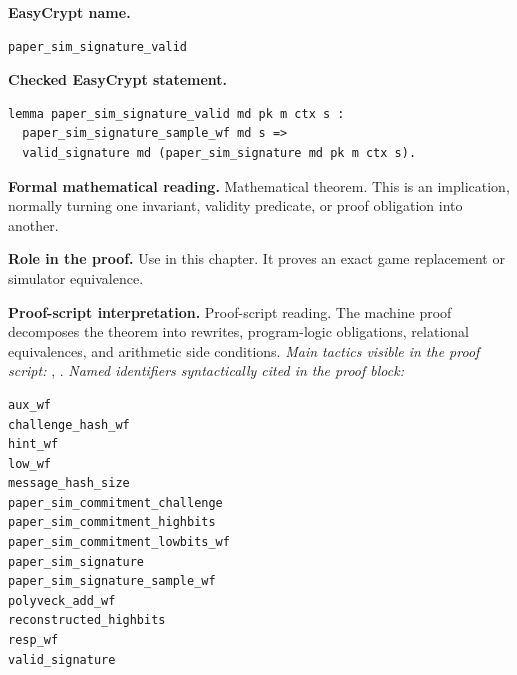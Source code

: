 \begin{formaltheorem}
\noindent\textbf{EasyCrypt name.}
\begin{lstlisting}[language=EasyCrypt,basicstyle=\ttfamily\scriptsize]
paper_sim_signature_valid
\end{lstlisting}
\noindent\textbf{Checked EasyCrypt statement.}
\begin{lstlisting}[language=EasyCrypt,basicstyle=\ttfamily\scriptsize]
lemma paper_sim_signature_valid md pk m ctx s :
  paper_sim_signature_sample_wf md s =>
  valid_signature md (paper_sim_signature md pk m ctx s).
\end{lstlisting}
\noindent\textbf{Formal mathematical reading.}
Mathematical theorem. This is an implication, normally turning one invariant, validity predicate, or proof obligation into another.

\noindent\textbf{Role in the proof.}
Use in this chapter. It proves an exact game replacement or simulator equivalence.

\noindent\textbf{Proof-script interpretation.}
Proof-script reading. The machine proof decomposes the theorem into rewrites, program-logic obligations, relational equivalences, and arithmetic side conditions.
\emph{Main tactics visible in the proof script:} , .
\emph{Named identifiers syntactically cited in the proof block:}
\begin{lstlisting}[language=EasyCrypt,basicstyle=\ttfamily\scriptsize]
aux_wf
challenge_hash_wf
hint_wf
low_wf
message_hash_size
paper_sim_commitment_challenge
paper_sim_commitment_highbits
paper_sim_commitment_lowbits_wf
paper_sim_signature
paper_sim_signature_sample_wf
polyveck_add_wf
reconstructed_highbits
resp_wf
valid_signature
\end{lstlisting}

\end{formaltheorem}

